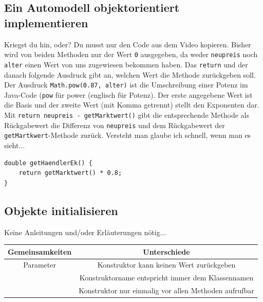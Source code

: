\documentclass{scrartcl}   %
\begin{document}
\newpage

\subsection{Ein Automodell objektorientiert implementieren}

\begin{itemize}
    \barrow Kriegst du hin, oder? Du musst nur den Code aus dem Video kopieren.
    \barrow Bisher wird von beiden Methoden nur der Wert \texttt{0} ausgegeben, da weder \texttt{neupreis} noch \texttt{alter} einen Wert von uns zugewiesen bekommen haben.
    \barrow Das \texttt{return} und der danach folgende Ausdruck gibt an, welchen Wert die Methode zurückgeben soll.
    \barrow Der Ausdruck \texttt{Math.pow(0.87, alter)} ist die Umschreibung einer Potenz im Java-Code (\texttt{pow} für \glqq power\grqq{} (englisch für Potenz). Der erste angegebene Wert ist die Basis und der zweite Wert (mit Komma getrennt) stellt den Exponenten dar.
    \barrow Mit \texttt{return neupreis - getMarktwert()} gibt die entsprechende Methode als Rückgabewert die Differenz von \texttt{neupreis} und dem Rückgabewert der \texttt{getMartkwert}-Methode zurück.
    \barrow Versteht man glaube ich schnell, wenn man es sieht...\\
    \begin{lstlisting}
double getHaendlerEk() {
    return getMarktwert() * 0.8;
}
\end{lstlisting}
\end{itemize}
    
\subsection{Objekte initialisieren}

\begin{itemize}
    \barrow Keine Anleitungen und/oder Erläuterungen nötig...
    \barrow \vspace{15pt}
    \begin{tabular}[ht]{c|c}
\\\textbf{Gemeinsamkeiten} & \textbf{Unterschiede}\\
\hline
Parameter & Konstruktor kann keinen Wert zurückgeben\\
\hline
& Konstruktorname entspricht immer dem Klassennamen\\
\hline
& Konstruktor nur einmalig vor allen Methoden aufrufbar\\
\end{tabular}
\end{itemize}
\end{document}
